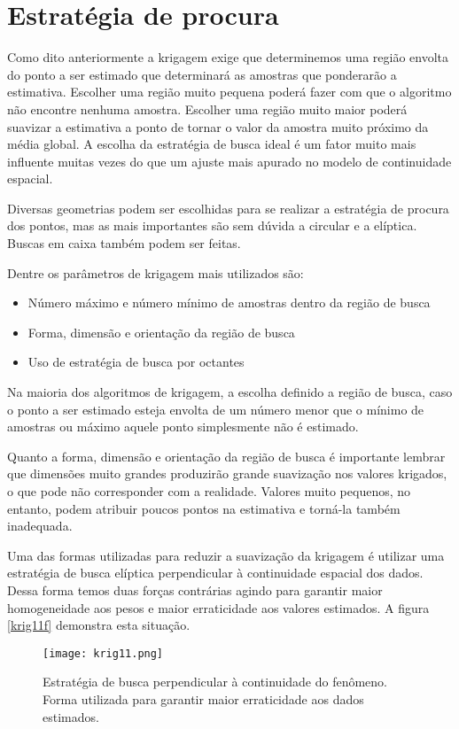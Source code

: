 \section{Estratégia de procura}

Como dito anteriormente a krigagem exige que determinemos uma região envolta do ponto a ser estimado que determinará as amostras que ponderarão a estimativa. Escolher uma região muito pequena poderá fazer com que o algoritmo não encontre nenhuma amostra. Escolher uma região muito maior poderá suavizar a estimativa a ponto de tornar o valor da amostra muito próximo da média global. A escolha da estratégia de busca ideal é um fator muito mais influente muitas vezes do que um ajuste mais apurado no modelo de continuidade espacial. 

Diversas geometrias podem ser escolhidas para se realizar a estratégia de procura dos pontos, mas as mais importantes são sem dúvida a circular e a elíptica. Buscas em caixa também podem ser feitas. 

Dentre os parâmetros de krigagem mais utilizados são: 

\begin{itemize}
  	\item Número máximo e número mínimo de amostras dentro da região de busca
  	\item Forma, dimensão e orientação da região de busca
  	\item Uso de estratégia de busca por octantes
\end{itemize} 

Na maioria dos algoritmos de krigagem, a escolha definido a região de busca, caso o ponto a ser estimado esteja envolta de um número menor que o mínimo de amostras ou máximo aquele ponto simplesmente não é estimado.

Quanto a forma, dimensão e orientação da região de busca é importante lembrar que dimensões muito grandes produzirão grande suavização nos valores krigados, o que pode não corresponder com a realidade. Valores muito pequenos, no entanto, podem atribuir poucos pontos na estimativa e torná-la também inadequada. 

Uma das formas utilizadas para reduzir a suavização da krigagem é utilizar uma estratégia de busca elíptica perpendicular à continuidade espacial dos dados. Dessa forma temos duas forças contrárias agindo para garantir maior homogeneidade aos pesos e maior erraticidade aos valores estimados. A figura \eqref{krig11f} demonstra esta situação.  

\begin{figure}[H]
	\centering
	\texttt{[image: krig11.png]}
	\caption{Estratégia de busca perpendicular à continuidade do fenômeno. Forma utilizada para garantir maior erraticidade aos dados estimados.  }
	\label{krig11f}
\end{figure}


